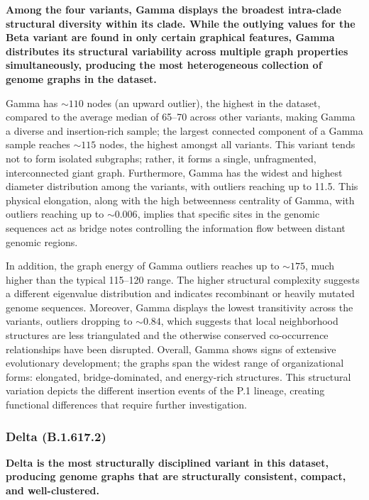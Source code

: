 \documentclass[conference]{IEEEtran}
\begin{document}
\textbf{Among the four variants, Gamma displays the broadest intra-clade structural diversity within its clade. While the outlying values for the Beta variant are found in only certain graphical features, Gamma distributes its structural variability across multiple graph properties simultaneously, producing the most heterogeneous collection of genome graphs in the dataset.}

Gamma has $\sim110$ nodes (an upward outlier), the highest in the dataset, compared to the average median of 65--70 across other variants, making Gamma a diverse and insertion-rich sample; the largest connected component of a Gamma sample reaches $\sim115$  nodes, the highest amongst all variants. This variant tends not to form isolated subgraphs; rather, it forms a single, unfragmented, interconnected giant graph. Furthermore, Gamma has the widest and highest diameter distribution among the variants, with outliers reaching up to 11.5. This physical elongation, along with the high betweenness centrality of Gamma, with outliers reaching up to $\sim 0.006$, implies that specific sites in the genomic sequences act as bridge notes controlling the information flow between distant genomic regions.

In addition, the graph energy of Gamma outliers reaches up to $\sim 175$, much higher than the typical 115--120 range. The higher structural complexity suggests a different eigenvalue distribution and indicates recombinant or heavily mutated genome sequences. Moreover, Gamma displays the lowest transitivity across the variants, outliers dropping to $\sim 0.84$, which suggests that local neighborhood structures are less triangulated and the otherwise conserved co-occurrence relationships have been disrupted. Overall, Gamma shows signs of extensive evolutionary development; the graphs span the widest range of organizational forms: elongated, bridge-dominated, and energy-rich structures. This structural variation depicts the different insertion events of the P.1 lineage, creating functional differences that require further investigation.

\subsubsection{Delta (B.1.617.2)}

\textbf{Delta is the most structurally disciplined variant in this dataset, producing genome graphs that are structurally consistent, compact, and well-clustered. }
\end{document}
